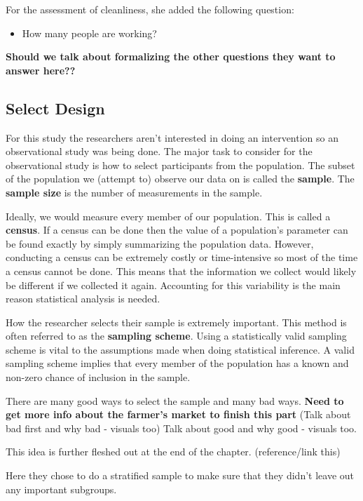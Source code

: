 \documentclass[
]{book}
\providecommand{\tightlist}{%
  \setlength{\itemsep}{0pt}\setlength{\parskip}{0pt}}
\theoremstyle{definition}
\theoremstyle{definition}
\theoremstyle{definition}
\theoremstyle{remark}
\begin{document}
For the assessment of cleanliness, she added the following question:

\begin{itemize}
\tightlist
\item
  How many people are working?
\end{itemize}

\textbf{Should we talk about formalizing the other questions they want to answer here??}

\hypertarget{select-design}{%
\subsection{Select Design}\label{select-design}}

For this study the researchers aren't interested in doing an intervention so an observational study was being done. The major task to consider for the observational study is how to select participants from the population. The subset of the population we (attempt to) observe our data on is called the \textbf{sample}. The \textbf{sample size} is the number of measurements in the sample.

Ideally, we would measure every member of our population. This is called a \textbf{census}. If a census can be done then the value of a population's parameter can be found exactly by simply summarizing the population data. However, conducting a census can be extremely costly or time-intensive so most of the time a census cannot be done. This means that the information we collect would likely be different if we collected it again. Accounting for this variability is the main reason statistical analysis is needed.

How the researcher selects their sample is extremely important. This method is often referred to as the \textbf{sampling scheme}. Using a statistically valid sampling scheme is vital to the assumptions made when doing statistical inference. A valid sampling scheme implies that every member of the population has a known and non-zero chance of inclusion in the sample.

There are many good ways to select the sample and many bad ways. \textbf{Need to get more info about the farmer's market to finish this part}
(Talk about bad first and why bad - visuals too) Talk about good and why good - visuals too.

This idea is further fleshed out at the end of the chapter. (reference/link this)

Here they chose to do a stratified sample to make sure that they didn't leave out any important subgroups.
\end{document}
